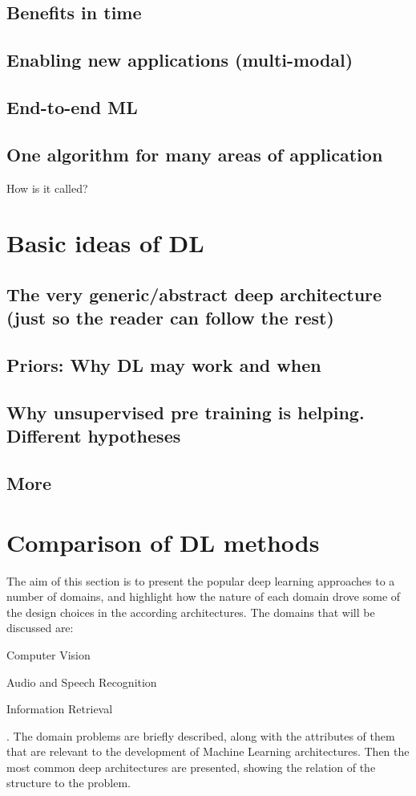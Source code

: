\documentclass[a4paper]{report}
\begin{document}
	\subsection{Benefits in time}
	\subsection{Enabling new applications (multi-modal)}
	\subsection{End-to-end ML}
	\subsection{One algorithm for many areas of application}
	How is it called?
\section{Basic ideas of DL}
	\subsection{The very generic/abstract deep architecture (just so the reader can follow the rest)}
	\subsection{Priors: Why DL may work and when}
	\subsection{Why unsupervised pre training is helping. Different hypotheses}	
	\subsection{More}
\section{Comparison of DL methods}
	The aim of this section is to present the popular deep learning approaches to a number of domains, and highlight how the nature of each domain drove some of the design choices in the according architectures. The domains that will be discussed are:
	\begin{enumerate*}
		\item Computer Vision
		\item Audio and Speech Recognition
		\item Information Retrieval
	\end{enumerate*}.	
	The domain problems are briefly described, along with the attributes of them that are relevant to the development of Machine Learning architectures. Then the most common deep architectures are presented, showing the relation of the structure to the problem.
\end{document}
